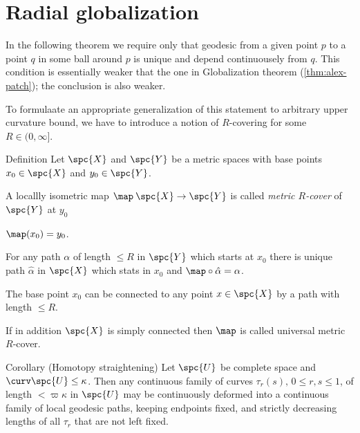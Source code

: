 \section{Radial globalization}

In the following theorem we require only that geodesic from a given point $p$ to a point $q$ in some ball around $p$ is unique and depend continuousely from $q$.
This condition is essentially weaker that the one in Globalization theorem (\ref{thm:alex-patch}); the conclusion is also weaker. 











To formulaate an appropriate generalization of this statement to arbitrary upper curvature bound, we have to introduce a notion of $R$-covering for some $R\in (0,\infty]$.

\begin{thm}{Definition}\label{def:R-cover}
Let $\spc{X}$ and $\spc{Y}$ be a metric spaces with base points $x_0\in\spc{X}$ and $y_0\in\spc{Y}$.

A locallly isometric map $\map\:\spc{X}\to\spc{Y}$ is called 
\emph{metric $R$-cover}%
of $\spc{Y}$ at $y_0$ 

\begin{subthm}{}
$\map(x_0)=y_0$.
\end{subthm}

\begin{subthm}{}
For any path $\alpha$ of length $\le R$ in $\spc{Y}$ which starts at $x_0$ there is unique path $\hat\alpha$ in $\spc{X}$ which stats in $x_0$ and $\map\circ\hat\alpha=\alpha$.
\end{subthm}

\begin{subthm}{}
The base point $x_0$ can be connected to any point $x\in\spc{X}$ by a path with length $\le R$.
\end{subthm}

If in addition $\spc{X}$ is simply connected then $\map$ is called universal metric $R$-cover.
\end{thm}









\begin{thm}{Corollary (Homotopy straightening)}
\label{cor:straight}
Let $\spc{U}$ be complete space and $\curv\spc{U}\le\kappa$. 
Then any continuous family of curves $\tau_r(s), \,0\le r,s\le 1$, of length $< \varpi\kappa$ in $\spc{U}$ may be continuously deformed into a continuous family of local geodesic paths, keeping endpoints fixed, and strictly decreasing lengths of all $\tau_r$ that are not left fixed. 
\end{thm}

